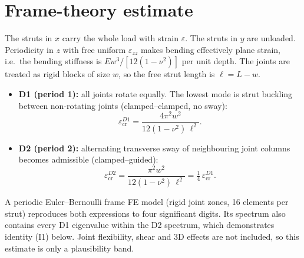 \documentclass[11pt,a4paper]{report}
\begin{document}
\section{Frame-theory estimate}
The struts in $x$ carry the whole load with strain $\varepsilon$. The struts
in $y$ are unloaded. Periodicity in $z$ with free uniform $\varepsilon_{zz}$
makes bending effectively plane strain, i.e.\ the bending stiffness is
$E w^3/[12(1-\nu^2)]$ per unit depth. The joints are treated as rigid blocks
of size $w$, so the free strut length is $\ell=L-w$.
\begin{itemize}
\item \textbf{D1 (period 1):} all joints rotate equally. The lowest mode is
  strut buckling between non-rotating joints (clamped--clamped, no sway):
  \begin{equation}
    \varepsilon_\text{cr}^{D1} = \frac{4\pi^2 w^2}{12(1-\nu^2)\,\ell^2} .
  \end{equation}
\item \textbf{D2 (period 2):} alternating transverse sway of neighbouring
  joint columns becomes admissible (clamped--guided):
  \begin{equation}
    \varepsilon_\text{cr}^{D2} = \frac{\pi^2 w^2}{12(1-\nu^2)\,\ell^2}
    = \tfrac14\,\varepsilon_\text{cr}^{D1} .
  \end{equation}
\end{itemize}
A periodic Euler--Bernoulli frame FE model (rigid joint zones, 16 elements
per strut) reproduces both expressions to four significant digits. Its spectrum also
contains every D1 eigenvalue within the D2 spectrum, which demonstrates
identity (I1) below. Joint flexibility, shear and 3D effects are not
included, so this estimate is only a plausibility band.
\end{document}

